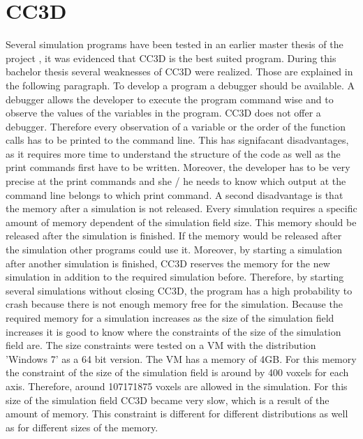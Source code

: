 \section{CC3D}
Several simulation programs have been tested in an earlier master thesis of the project \cite{MSCAngelo}, it was evidenced that \ac{CC3D} is the best suited program. During this bachelor thesis several weaknesses of \ac{CC3D} were realized. Those are explained in the following paragraph. \newline
To develop a program a debugger should be available. A debugger allows the developer to execute the program command wise and to observe the values of the variables in the program. \ac{CC3D} does not offer a debugger. Therefore every observation of a variable or the order of the function calls has to be printed to the command line. This has signifacant disadvantages, as it requires more time to understand the structure of the code as well as the print commands first have to be written. Moreover, the developer has to be very precise at the print commands and she / he needs to know which output at the command line belongs to which print command. \newline
A second disadvantage is that the memory after a simulation is not released. Every simulation requires a specific amount of memory dependent of the simulation field size. This memory should be released after the simulation is finished. If the memory would be released after the simulation other programs could use it. Moreover, by starting a simulation after another simulation is finished, \ac{CC3D} reserves the memory for the new simulation in addition to the required simulation before. Therefore, by starting several simulations without closing \ac{CC3D}, the program has a high probability to crash because there is not enough memory free for the simulation. \newline
Because the required memory for a simulation increases as the size of the simulation field increases it is good to know where the constraints of the size of the simulation field are. The size constraints were tested on a \ac{VM} with the distribution 'Windows 7' as a 64 bit version. The \ac{VM} has a memory of 4GB. For this memory the constraint of the size of the simulation field is around by 400 voxels for each axis. Therefore, around 107171875 voxels are allowed in the simulation. For this size of the simulation field \ac{CC3D} became very slow, which is a result of the amount of memory. This constraint is different for different distributions as well as for different sizes of the memory. 

